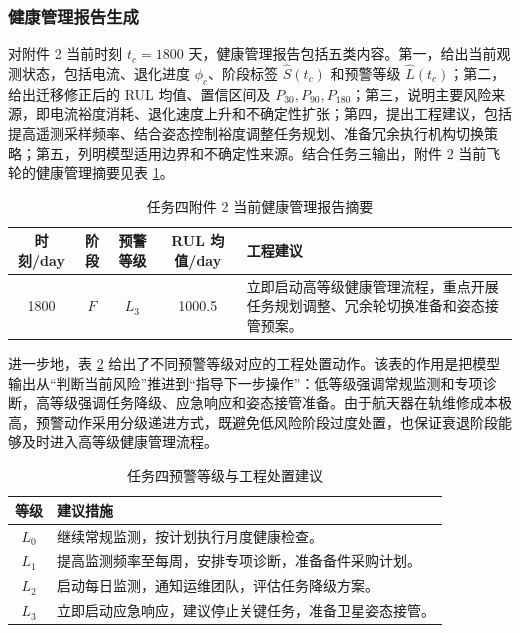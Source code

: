 \subsubsection{健康管理报告生成}

对附件 2 当前时刻 $t_c=1800$ 天，健康管理报告包括五类内容。第一，给出当前观测状态，包括电流、退化进度 $\phi_c$、阶段标签 $\hat S(t_c)$ 和预警等级 $\hat L(t_c)$；第二，给出迁移修正后的 RUL 均值、置信区间及 $P_{30},P_{90},P_{180}$；第三，说明主要风险来源，即电流裕度消耗、退化速度上升和不确定性扩张；第四，提出工程建议，包括提高遥测采样频率、结合姿态控制裕度调整任务规划、准备冗余执行机构切换策略；第五，列明模型适用边界和不确定性来源。结合任务三输出，附件 2 当前飞轮的健康管理摘要见表 \ref{tab:q4_report_solution}。

\begin{table}[H]
  \centering
  \caption{任务四附件 2 当前健康管理报告摘要}
  \label{tab:q4_report_solution}
  \begin{tabularx}{\textwidth}{c c c c X}
    \toprule
    时刻/day & 阶段 & 预警等级 & RUL 均值/day & 工程建议 \\
    \midrule
    1800 & $F$ & $L_3$ & 1000.5 & 立即启动高等级健康管理流程，重点开展任务规划调整、冗余轮切换准备和姿态接管预案。 \\
    \bottomrule
  \end{tabularx}
\end{table}

进一步地，表 \ref{tab:q4_action_solution} 给出了不同预警等级对应的工程处置动作。该表的作用是把模型输出从“判断当前风险”推进到“指导下一步操作”：低等级强调常规监测和专项诊断，高等级强调任务降级、应急响应和姿态接管准备。由于航天器在轨维修成本极高，预警动作采用分级递进方式，既避免低风险阶段过度处置，也保证衰退阶段能够及时进入高等级健康管理流程。
\begin{table}[H]
  \centering
  \caption{任务四预警等级与工程处置建议}
  \label{tab:q4_action_solution}
  \begin{tabularx}{\textwidth}{cX}
    \toprule
    等级 & 建议措施 \\
    \midrule
    $L_0$ & 继续常规监测，按计划执行月度健康检查。 \\
    $L_1$ & 提高监测频率至每周，安排专项诊断，准备备件采购计划。 \\
    $L_2$ & 启动每日监测，通知运维团队，评估任务降级方案。 \\
    $L_3$ & 立即启动应急响应，建议停止关键任务，准备卫星姿态接管。 \\
    \bottomrule
  \end{tabularx}
\end{table}

